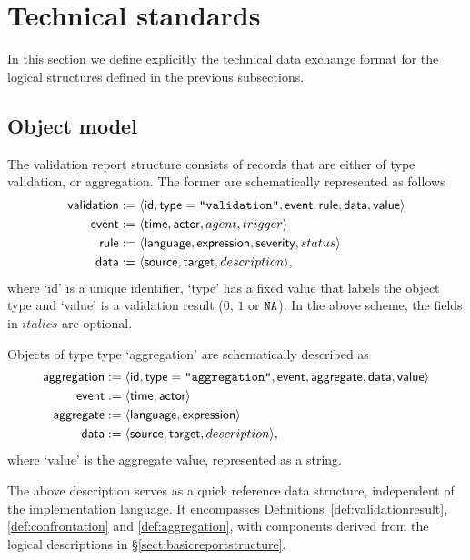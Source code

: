\section{Technical standards}
\label{sect:standards}
In this section we define explicitly the technical data exchange format for the
logical structures defined in the previous subsections.

\subsection{Object model}
The validation report structure consists of records that are either of
type validation, or aggregation. The former are schematically represented as
follows
\begin{align*}
\textsf{validation}&:=\langle
  \textsf{id}
, \textsf{type}=\texttt{"validation"}
, \textsf{event}
, \textsf{rule}
,\textsf{data}
,\textsf{value}\rangle\\
\textsf{event} &:= \langle
  \textsf{time}
, \textsf{actor}
, agent
, trigger\rangle\\
\textsf{rule} &:=\langle
  \textsf{language}
, \textsf{expression}
, \textsf{severity}
, status\rangle\\
\textsf{data} &:=\langle
  \textsf{source}
, \textsf{target}
, description\rangle,
\end{align*}
where `id' is a unique identifier, `type' has a fixed value that labels the
object type and `value' is a validation result ($0$, $1$ or ${\normalfont \texttt{NA}}{}$). In the
above scheme, the fields in $italics$ are optional. 

Objects of type type `aggregation' are schematically described as
\begin{align*}
\textsf{aggregation} &:=\langle
  \textsf{id}
, \textsf{type}=\texttt{"aggregation"}
, \textsf{event}
, \textsf{aggregate}
, \textsf{data}
,\textsf{value}\rangle\\
\textsf{event} &:= \langle
  \textsf{time}
, \textsf{actor}\rangle\\
\textsf{aggregate} &:=\langle
  \textsf{language}
, \textsf{expression}\rangle\\
\textsf{data} &:=\langle
  \textsf{source}
, \textsf{target}
, description\rangle,
\end{align*}
where `value' is the aggregate value, represented as a string.

The above description serves as a quick reference data structure, independent
of the implementation language. It encompasses
Definitions~\ref{def:validationresult}, \ref{def:confrontation} and
\ref{def:aggregation}, with components derived from the logical descriptions in
\S\ref{sect:basicreportstructure}.

